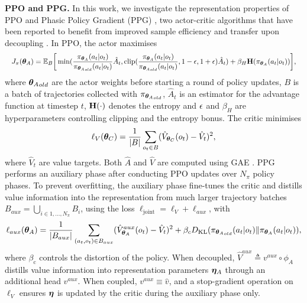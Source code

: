 \textbf{PPO and PPG.} In this work, we investigate the representation properties of PPO \citep{PPO} and Phasic Policy Gradient (PPG) \citep{PPG}, two actor-critic algorithms that have been reported to benefit from improved sample efficiency and transfer upon decoupling \citep{raileanu2021decoupling, PPG}. In PPO, the actor maximises
\begin{equation}\label{c2:eq:J_PPO}
    \resizebox{\linewidth}{!}{$\displaystyle
    J_\pi(\vtheta_A) = \E_{B}\bigg[ \min (\frac{\pi_{\vtheta_A} (a_t|o_t)}{\pi_{{\vtheta_A}_{old}} (a_t|o_t)}\hat{A}_t, \text{clip}(\frac{\pi_{\vtheta_A} (a_t|o_t)}{\pi_{{\vtheta_A}_{old}} (a_t|o_t)}, 1 - \epsilon, 1 + \epsilon)\hat{A}_t) + \beta_H \entropy(\pi_{\vtheta_A}(a_t|o_t))\bigg],
    $}
\end{equation}
where ${{\bm{\theta}}_A}_{old}$ are the actor weights before starting a round of policy updates, $B$ is a batch of trajectories collected with $\pi_{{{\bm{\theta}}_A}_{old}}$, $\hat{A}_t$ is an estimator for the advantage function at timestep $t$, $\mathbf{H}(\cdot)$ denotes the entropy and ${\epsilon}$ and $\beta_H$ are hyperparameters controlling clipping and the entropy bonus. The critic minimises
\begin{equation}\label{c2:eq:LV_PPO}
    \ell_V({\bm{\theta}}_C) = \frac{1}{|B|} \sum_{o_t \in B} (\hat{V}_{{\bm{\theta}}_C}(o_t) - \hat{V}_t)^2, 
\end{equation}
where $\hat{V}_t$ are value targets. Both $\hat{A}$ and $\hat{V}$ are computed using GAE \citep{GAE}. PPG performs an auxiliary phase after conducting PPO updates over $N_\pi$ policy phases. To prevent overfitting, the auxiliary phase fine-tunes the critic and distills value information into the representation from much larger trajectory batches $B_{aux} = \bigcup_{i\in 1, \dots, N_\pi} B_i$, using the loss $\ell_\text{joint} = \ell_V + \ell_{aux}$, with
\begin{equation}\label{c2:eq:PPG_Laux}
    \ell_{aux}({\bm{\theta}}_A) = \frac{1}{|B_{aux}|}\sum_{(a_t,o_t) \in B_{aux}}(\hat{V}^{aux}_{{\bm{\theta}}_A}(o_t) - \hat{V}_t)^2 + \beta_{c} D_{\mathrm{KL}} ( \pi_{{{\bm{\theta}}_A}_{old}}(a_t|o_t) \Vert \pi_{{{\bm{\theta}}_A}}(a_t|o_t)),
\end{equation}
where $\beta_\text{c}$ controls the distortion of the policy. When decoupled, $\hat{V}^{aux}\triangleq v^{aux} \circ \phi_{A} $ distills value information into representation parameters ${\bm{\eta}}_A$ through an additional head $v^{aux}$. When coupled, $v^{aux} \equiv \hat{v}$, and a stop-gradient operation on $\ell_V$ ensures ${\bm{\eta}}$ is updated by the critic during the auxiliary phase only.

